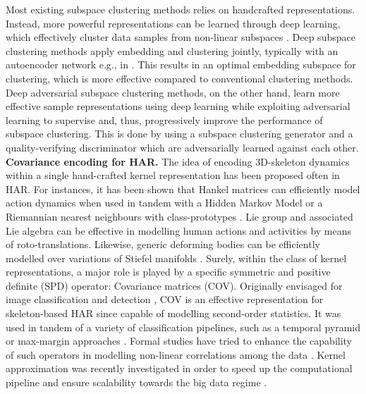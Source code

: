\documentclass[10pt,a4paper,conference]{IEEEtran}
\begin{document}
Most existing subspace clustering methods relies on handcrafted representations. Instead, more powerful representations can be learned through deep learning, which effectively cluster data samples from non-linear subspaces \cite{ji2017deep}. Deep subspace clustering methods apply embedding and clustering jointly, typically with an autoencoder network e.g., in \cite{ji2017deep,Yang2019}. This results in an optimal embedding subspace for clustering, which is more effective compared to conventional clustering methods. Deep adversarial subspace clustering methods, on the other hand, learn more effective sample representations using deep learning while exploiting adversarial learning to supervise and, thus, progressively improve the performance of subspace clustering. This is done by using a subspace clustering generator and a quality-verifying discriminator which are adversarially learned against each other.
\newline
\textbf{Covariance encoding for HAR.} The idea of encoding 3D-skeleton dynamics within a single hand-crafted kernel representation has been proposed often in HAR. For instances, it has been shown that Hankel matrices can efficiently model action dynamics when used in tandem with a Hidden Markov Model \cite{Camps:ACCV14} or a Riemannian nearest neighbours with class-prototypes \cite{Camps:CVPR16}. Lie group \cite{Vemulapalli:CVPR14} and associated Lie algebra \cite{Vemulapalli:CVPR16} can be effective in modelling human actions and activities by means of roto-translations. Likewise, generic deforming bodies can be efficiently modelled over variations of Stiefel manifolds \cite{delbue2011bilinear}. Surely, within the class of kernel representations, a major role is played by a specific symmetric and positive definite (SPD) operator: Covariance matrices (COV). Originally envisaged for image classification and detection \cite{TPM:ECCV06}, COV is an effective representation for skeleton-based HAR since capable of modelling second-order statistics. It was used in tandem of a variety of classification pipelines, such as a temporal pyramid \cite{egizi} or max-margin approaches \cite{Wang:ICCV15,ECCV16}. Formal studies have tried to enhance the capability of such operators in modelling non-linear correlations among the data \cite{Harandi:CVPR14,Cavazza:ICPR16}. Kernel approximation was recently investigated in order to speed up the computational pipeline and ensure scalability towards the big data regime \cite{Cavazza2019}.
\end{document}
